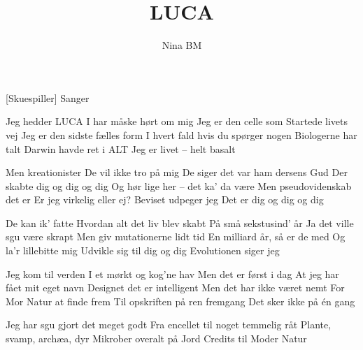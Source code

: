 \documentclass[a4paper,11pt]{article}
\title{LUCA}
\author{Nina BM}
\begin{document}
\maketitle

\begin{roles}
[Skuespiller] Sanger
\end{roles}

\begin{song}


  

   Jeg hedder LUCA
I har måske hørt om mig
Jeg er den celle som
Startede livets vej
Jeg er den sidste fælles form
I hvert fald hvis du spørger nogen
Biologerne har talt
Darwin havde ret i ALT
Jeg er livet -- helt basalt

Men kreationister
De vil ikke tro på mig
De siger det var ham dersens Gud
Der skabte dig og dig og dig
Og hør lige her -- det ka' da være
Men pseudovidenskab det er
Er jeg virkelig eller ej?
Beviset udpeger jeg
Det er dig og dig og dig

De kan ik' fatte
Hvordan alt det liv blev skabt
På små sekstusind' år
Ja det ville sgu være skrapt
Men giv mutationerne lidt tid
En milliard år, så er de med
Og la'r lillebitte mig
Udvikle sig til dig og dig
Evolutionen siger jeg

Jeg kom til verden
I et mørkt og kog'ne hav 
Men det er først i dag
At jeg har fået mit eget navn
Designet det er intelligent
Men det har ikke været nemt
For Mor Natur at finde frem
Til opskriften på ren fremgang
Det sker ikke på én gang

Jeg har sgu gjort det meget godt
Fra encellet til noget temmelig råt 
Plante, svamp, archæa, dyr
Mikrober overalt på Jord
Credits til Moder Natur

\end{song}
\end{document}
